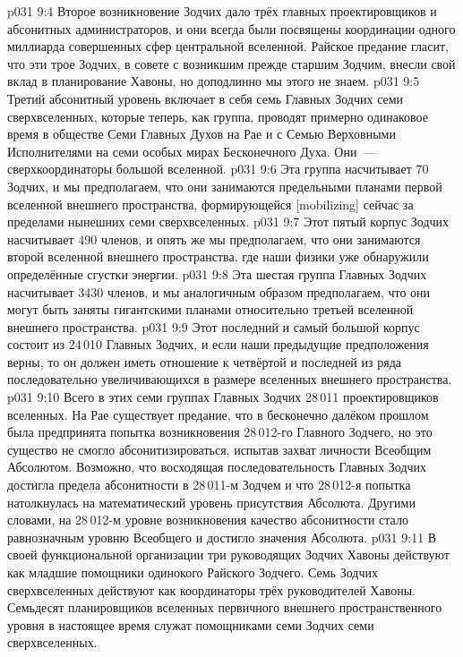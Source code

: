 \vs p031 9:4  Второе возникновение Зодчих дало трёх главных проектировщиков и абсонитных администраторов, и они всегда были посвящены координации одного миллиарда совершенных сфер центральной вселенной. Райское предание гласит, что эти трое Зодчих, в совете с возникшим прежде старшим Зодчим, внесли свой вклад в планирование Хавоны, но доподлинно мы этого не знаем.
\vs p031 9:5  Третий абсонитный уровень включает в себя семь Главных Зодчих семи сверхвселенных, которые теперь, как группа, проводят примерно одинаковое время в обществе Семи Главных Духов на Рае и с Семью Верховными Исполнителями на семи особых мирах Бесконечного Духа. Они~--- сверхкоординаторы большой вселенной.
\vs p031 9:6  Эта группа насчитывает 70 Зодчих, и мы предполагаем, что они занимаются предельными планами первой вселенной внешнего пространства, формирующейся [mobilizing] сейчас за пределами нынешних семи сверхвселенных.
\vs p031 9:7  Этот пятый корпус Зодчих насчитывает 490 членов, и опять же мы предполагаем, что они занимаются второй вселенной внешнего пространства, где наши физики уже обнаружили определённые сгустки энергии.
\vs p031 9:8  Эта шестая группа Главных Зодчих насчитывает 3430 членов, и мы аналогичным образом предполагаем, что они могут быть заняты гигантскими планами относительно третьей вселенной внешнего пространства.
\vs p031 9:9  Этот последний и самый большой корпус состоит из 24\,010 Главных Зодчих, и если наши предыдущие предположения верны, то он должен иметь отношение к четвёртой и последней из ряда последовательно увеличивающихся в размере вселенных внешнего пространства.
\vs p031 9:10 \pc Всего в этих семи группах Главных Зодчих 28\,011 проектировщиков вселенных. На Рае существует предание, что в бесконечно далёком прошлом была предпринята попытка возникновения 28\,012\hyp{}го Главного Зодчего, но это существо не смогло абсонитизироваться, испытав захват личности Всеобщим Абсолютом. Возможно, что восходящая последовательность Главных Зодчих достигла предела абсонитности в 28\,011\hyp{}м Зодчем и что 28\,012\hyp{}я попытка натолкнулась на математический уровень присутствия Абсолюта. Другими словами, на 28\,012\hyp{}м уровне возникновения качество абсонитности стало равнозначным уровню Всеобщего и достигло значения Абсолюта.
\vs p031 9:11 \pc В своей функциональной организации три руководящих Зодчих Хавоны действуют как младшие помощники одинокого Райского Зодчего. Семь Зодчих сверхвселенных действуют как координаторы трёх руководителей Хавоны. Семьдесят планировщиков вселенных первичного внешнего пространственного уровня в настоящее время служат помощниками семи Зодчих семи сверхвселенных.
